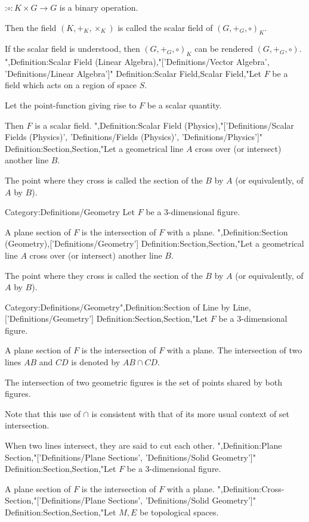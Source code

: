 :$\circ: K \times G \to G$ is a binary operation.


Then the field $\left( K, +_K, \times_K \right)$ is called the scalar field of $\left( G, +_G, \circ \right)_K$.


If the scalar field is understood, then $\left( G, +_G, \circ \right)_K$ can be rendered $\left( G, +_G, \circ \right)$.
",Definition:Scalar Field (Linear Algebra),"['Definitions/Vector Algebra', 'Definitions/Linear Algebra']"
Definition:Scalar Field,Scalar Field,"Let $F$ be a field which acts on a region of space $S$.

Let the point-function giving rise to $F$ be a scalar quantity.


Then $F$ is a scalar field.
",Definition:Scalar Field (Physics),"['Definitions/Scalar Fields (Physics)', 'Definitions/Fields (Physics)', 'Definitions/Physics']"
Definition:Section,Section,"Let a geometrical line $A$ cross over (or intersect) another line $B$.

The point where they cross is called the section of the $B$ by $A$ (or equivalently, of $A$ by $B$).


Category:Definitions/Geometry
Let $F$ be a $3$-dimensional figure.

A plane section of $F$ is the intersection of $F$ with a plane.
",Definition:Section (Geometry),['Definitions/Geometry']
Definition:Section,Section,"Let a geometrical line $A$ cross over (or intersect) another line $B$.

The point where they cross is called the section of the $B$ by $A$ (or equivalently, of $A$ by $B$).


Category:Definitions/Geometry",Definition:Section of Line by Line,['Definitions/Geometry']
Definition:Section,Section,"Let $F$ be a $3$-dimensional figure.

A plane section of $F$ is the intersection of $F$ with a plane.
The intersection of two lines $AB$ and $CD$ is denoted by $AB \cap CD$.

The intersection of two geometric figures is the set of points shared by both figures.


Note that this use of $\cap$ is consistent with that of its more usual context of set intersection.


When two lines intersect, they are said to cut each other.
",Definition:Plane Section,"['Definitions/Plane Sections', 'Definitions/Solid Geometry']"
Definition:Section,Section,"Let $F$ be a $3$-dimensional figure.

A plane section of $F$ is the intersection of $F$ with a plane.
",Definition:Cross-Section,"['Definitions/Plane Sections', 'Definitions/Solid Geometry']"
Definition:Section,Section,"Let $M, E$ be topological spaces. 

